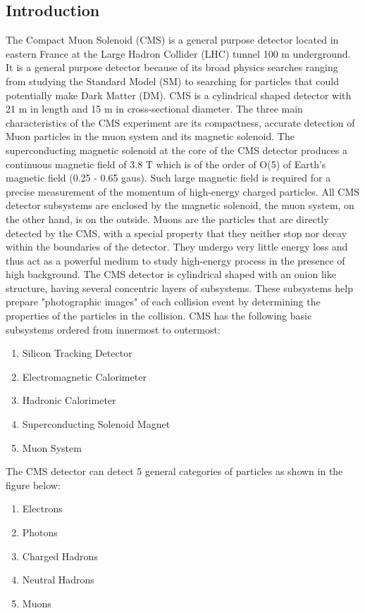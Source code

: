 \subsection{Introduction}
The Compact Muon Solenoid (CMS) is a general purpose detector located in eastern France at the Large Hadron Collider (LHC) tunnel 100 m underground. It is a general purpose detector because of its broad physics searches ranging from studying the Standard Model (SM) to searching for particles that could potentially make Dark Matter (DM). CMS is a cylindrical shaped detector with 21 m in length and 15 m in cross-sectional diameter. The three main characteristics of the CMS experiment are its compactness, accurate detection of Muon particles in the muon system and its magnetic solenoid. The superconducting magnetic solenoid at the core of the CMS detector produces a continuous magnetic field of 3.8 T which is of the order of O(5) of Earth's magnetic field (0.25 - 0.65 gaus). Such large magnetic field is required for a precise measurement of the momentum of high-energy charged particles. All CMS detector subsystems are enclosed by the magnetic solenoid, the muon system, on the other hand, is on the outside. Muons are the particles that are directly detected by the CMS, with a special property that they neither stop nor decay within the boundaries of the detector. They undergo very little energy loss and thus act as a powerful medium to study high-energy process in the presence of high background.
The CMS detector is cylindrical shaped with an onion like structure, having several concentric layers of subsystems. These subsystems help prepare "photographic images" of each collision event by determining the properties of the particles in the collision. CMS has the following basic subsystems ordered from innermost to outermost:

\begin{enumerate}
    \item Silicon Tracking Detector
    \item Electromagnetic Calorimeter
    \item Hadronic Calorimeter
    \item Superconducting Solenoid Magnet
    \item Muon System
    
    
\end{enumerate}
The CMS detector can detect 5 general categories of particles as shown in the figure below:
 \begin{enumerate}
    \item Electrons
    \item Photons
    \item Charged Hadrons
    \item Neutral Hadrons
    \item Muons
\end{enumerate}

